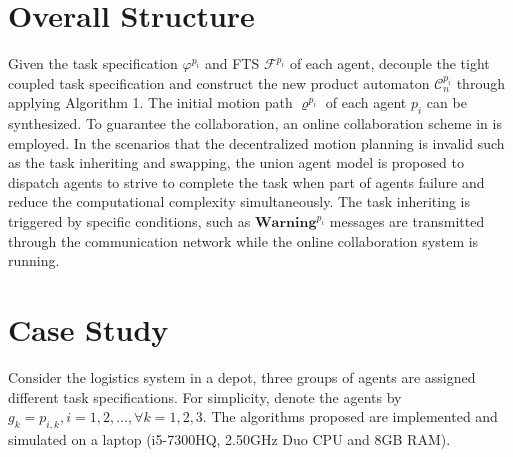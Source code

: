 \documentclass[journal]{IEEEtran}
\begin{document}
\section{Overall Structure}
Given the task specification $\varphi^{p_i}$ and FTS $\mathcal{F}^{p_i}$ of each agent, decouple the tight coupled task specification and construct the new product automaton $\mathcal{C}^{p_i}_n$ through applying Algorithm 1. The initial motion path $\varrho^{p_i}$ of each agent $p_i$ can be synthesized. To guarantee the collaboration, an online collaboration scheme in \cite{guo2017task} is employed. In the scenarios that the decentralized motion planning is invalid such as the task inheriting and swapping, the union agent model is proposed to dispatch agents to strive to complete the task when part of agents failure and reduce the computational complexity simultaneously. The task inheriting is triggered by specific conditions, such as $\textbf{Warning}^{p_i}$ messages are transmitted through the communication network while the online collaboration system is running.
\section{Case Study}
Consider the logistics system in a depot, three groups of agents are assigned different task specifications. For simplicity, denote the agents by $g_k={p_{i,k},i=1,2,...},\forall k=1,2,3$. The algorithms proposed are implemented and simulated on a laptop (i5-7300HQ, 2.50GHz Duo CPU and 8GB RAM).
\end{document}
